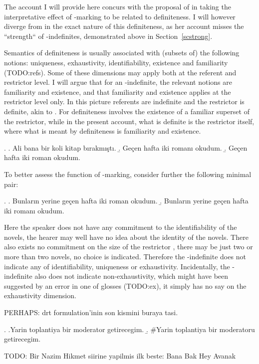 \documentclass[11pt,a4paper]{article}
\begin{document}
The account I will provide here concurs with the proposal of  in taking the interpretative effect of \acc-marking to be related to definiteness. I will however diverge from  in the exact nature of this definiteness, as her account misses the ``strength`` of \acc-indefinites, demonstrated above in Section~\ref{scstrong}.

Semantics of definiteness is usually associated with (subsets of) the following notions: uniqueness, exhaustivity, identifiability, existence and familiarity (TODO:refs). Some of these dimensions may apply both at the referent and restrictor level. I will argue that for an \acc-indefinite, the relevant notions are familiarity and existence, and that familiarity and existence applies at the restrictor level only. In this picture referents are indefinite and the restrictor is definite, akin to . For  definiteness involves the existence of a familiar superset of the restrictor, while in the present account, what is definite is the restrictor itself, where what is meant by definiteness is familiarity and existence. 

\ex. \a. Ali bana bir koli kitap bırakmıştı.
\b. Geçen hafta iki romanı okudum.
\b. Geçen hafta iki roman okudum.

To better assess the function of \acc-marking, consider further the following minimal pair:

\ex.
\a. Bunların yerine geçen hafta iki roman okudum.
\b. Bunların yerine geçen hafta iki romanı okudum.

Here the speaker does not have any commitment to the identifiability of the
novels, the hearer may well have no idea about the identity of the novels.
There also exists no commitment on the size of the restrictor ,
there may be just two or more than two novels, no choice is indicated.
Therefore the \acc-indefinite does not indicate any of identifiability,
uniqueness or exhaustivity. Incidentally, the \acc-indefinite also does not
indicate non-exhaustivity, which might have been suggested by an error in one
of   glosses (TODO:ex), it simply has no say on the exhaustivity
dimension.


PERHAPS: drt formulation'inin son kismini buraya tasi.


\ex. \a.Yarin toplantiya bir moderator getirecegim.
\b. \#Yarin toplantiya bir moderatoru getirecegim.

TODO: Bir Nazim Hikmet siirine yapilmis ilk beste: Bana Bak Hey Avanak
\end{document}
